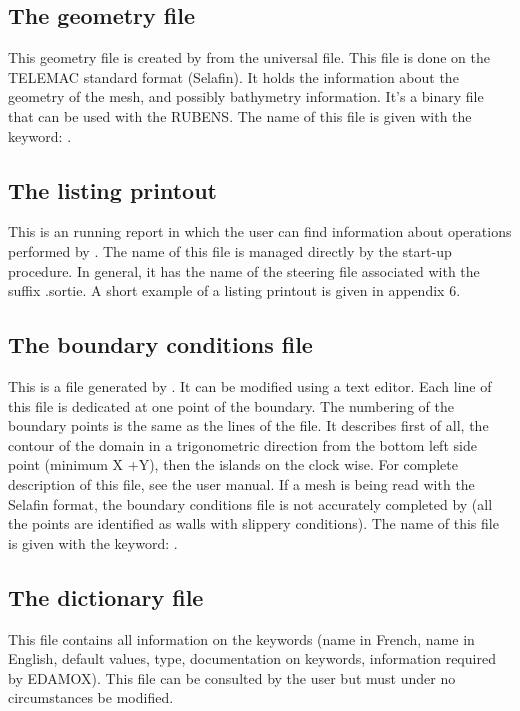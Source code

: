 \subsection{The geometry file}
This geometry file is created by \stbtel from the universal file. This file is
done on the TELEMAC standard format (Selafin). It holds the information about
the geometry of the mesh, and possibly bathymetry information.
It’s a binary file that can be used with the RUBENS.
The name of this file is given with the keyword: .

\subsection{The listing printout}
This is an \stbtel running report in which the user can find information about
operations performed by \stbtel.
The name of this file is managed directly by the \stbtel start-up procedure. In
general, it has the name of the steering file associated with the suffix
.sortie. A short example of a listing printout is given in appendix 6.
\subsection{The boundary conditions file}
This is a file generated by \stbtel. It can be modified using a text editor.
Each line of this file is dedicated at one point of the boundary. The numbering
of the boundary points is the same as the lines of the file.  It describes
first of all, the contour of the domain in a trigonometric direction from the
bottom left side point (minimum X +Y), then the islands on the clock wise.
For complete description of this file, see the  user manual.
If a mesh is being read with the Selafin format, the boundary conditions file
is not accurately completed by \stbtel (all the points are identified as walls
with slippery conditions).
The name of this file is given with the keyword: .
\subsection{The dictionary file}
This file contains all information on the keywords (name in French, name in
English, default values, type, documentation on keywords, information required
by EDAMOX). This file can be consulted by the user but must under no
circumstances be modified.
